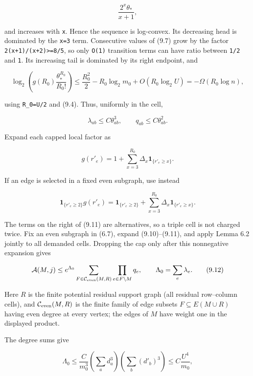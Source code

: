 \documentclass[
  11pt,
  a4paper,
]{article}
\renewcommand{\setminus}{\mathbin{\backslash}}%
\begin{document}
\[
 \frac{2^x\theta_*}{x+1},                                \tag{9.7}
\]

and increases with \texttt{x}. Hence the sequence is log-convex. Its
decreasing head is dominated by the \texttt{x=3} term. Consecutive
values of (9.7) grow by the factor
\texttt{2(x+1)/(x+2)\textgreater{}=8/5}, so only \texttt{O(1)}
transition terms can have ratio between \texttt{1/2} and \texttt{1}. Its
increasing tail is dominated by its right endpoint, and

\[
 \log_2\left(g(R_0)\frac{\theta_*^{R_0}}{R_0!}\right)
 \le\frac{R_0^2}{2}-R_0\log_2m_0+O(R_0\log_2U)
 =-\Omega(R_0\log n),                                   \tag{9.8}
\]

using \texttt{R\_0=U/2} and (9.4). Thus, uniformly in the cell,

\[
 \lambda_{ab}\le C\theta_{ab}^3,\qquad
 q_{ab}\le C\theta_{ab}^2.                              \tag{9.9}
\]

Expand each capped local factor as

\[
 g(r'_e)=1+\sum_{x=3}^{R_0}\Delta_x
                   \mathbf1_{\{r'_e\ge x\}}.            \tag{9.10}
\]

If an edge is selected in a fixed even subgraph, use instead

\[
 \mathbf1_{\{r'_e\ge2\}}g(r'_e)
 =\mathbf1_{\{r'_e\ge2\}}
  +\sum_{x=3}^{R_0}\Delta_x\mathbf1_{\{r'_e\ge x\}}.   \tag{9.11}
\]

The terms on the right of (9.11) are alternatives, so a triple cell is
not charged twice. Fix an even subgraph in (6.7), expand (9.10)--(9.11),
and apply Lemma 6.2 jointly to all demanded cells. Dropping the cap only
after this nonnegative expansion gives

\[
 \mathcal A(M,j)
 \le e^{\Lambda_0}
  \sum_{F\in\mathcal C_{\rm even}(M,R)}
       \prod_{e\in F\setminus M}q_e,\qquad
 \Lambda_0=\sum_e\lambda_e.                              \tag{9.12}
\]

Here \(R\) is the finite potential residual support graph (all residual
row--column cells), and \(\mathcal C_{\rm even}(M,R)\) is the finite
family of edge subsets \(F\subseteq E(M\cup R)\) having even degree at
every vertex; the edges of \(M\) have weight one in the displayed
product.

The degree sums give

\[
 \Lambda_0\le\frac C{m_0^3}
   \left(\sum_a d_a^3\right)\left(\sum_b(d'_b)^3\right)
 \le C\frac{U^4}{m_0},                                  \tag{9.13}
\]
\end{document}
